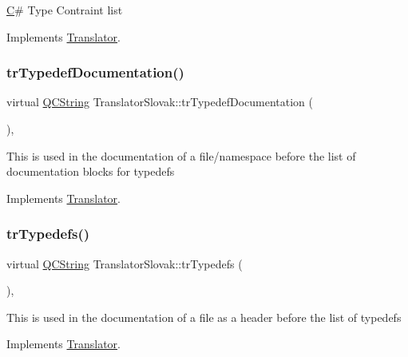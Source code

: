 \mbox{\hyperlink{class_c}{C}}\# Type Contraint list 

Implements \mbox{\hyperlink{class_translator}{Translator}}.

\mbox{\label{class_translator_slovak_a30f99e696870d51435370fe79c4a22ba}} 
\subsubsection{\texorpdfstring{trTypedefDocumentation()}{trTypedefDocumentation()}}
{\footnotesize\ttfamily virtual \mbox{\hyperlink{class_q_c_string}{Q\+C\+String}} Translator\+Slovak\+::tr\+Typedef\+Documentation (\begin{DoxyParamCaption}{ }\end{DoxyParamCaption})\hspace{0.3cm}{\ttfamily [inline]}, {\ttfamily [virtual]}}

This is used in the documentation of a file/namespace before the list of documentation blocks for typedefs 

Implements \mbox{\hyperlink{class_translator}{Translator}}.

\mbox{\label{class_translator_slovak_a4c73a9bc214db1adff34ed56367bb8cb}} 
\subsubsection{\texorpdfstring{trTypedefs()}{trTypedefs()}}
{\footnotesize\ttfamily virtual \mbox{\hyperlink{class_q_c_string}{Q\+C\+String}} Translator\+Slovak\+::tr\+Typedefs (\begin{DoxyParamCaption}{ }\end{DoxyParamCaption})\hspace{0.3cm}{\ttfamily [inline]}, {\ttfamily [virtual]}}

This is used in the documentation of a file as a header before the list of typedefs 

Implements \mbox{\hyperlink{class_translator}{Translator}}.

\mbox{\label{class_translator_slovak_abfb8e71379d3ce51e35cb6105ece66f5}} 
